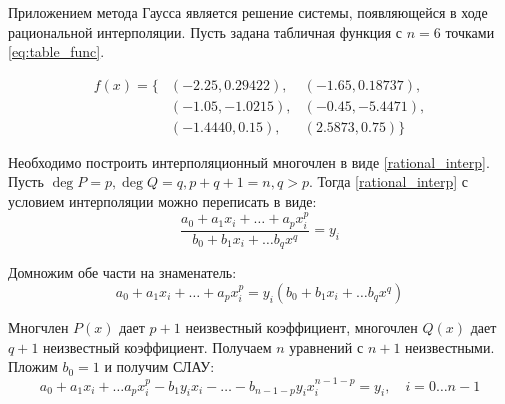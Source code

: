 \documentclass[a4paper, fontsize=14pt]{article}
\begin{document}
Приложением метода Гаусса является решение системы, появляющейся в ходе рациональной интерполяции. Пусть задана табличная функция с $n = 6$ точками \eqref{eq:table_func}.

\begin{equation}
    \label{eq:table_func}
    \begin{aligned}
        f(x) = \{&(-2.25,0.29422), &(-1.65, 0.18737), \\
                &(-1.05, -1.0215), &(-0.45,-5.4471), \\
                &(-1.4440,0.15), &(2.5873, 0.75)\}
        \end{aligned}
\end{equation}

Необходимо построить интерполяционный многочлен в виде \eqref{rational_interp}.
Пусть $\operatorname{deg} P = p, \operatorname{deg} Q = q, p + q + 1= n, q > p$. Тогда \eqref{rational_interp} с условием интерполяции можно переписать в виде:
\begin{equation*}
    \frac{a_0 + a_1 x_i + \dots + a_p x_i^p}{b_0 + b_1 x_i + \dots b_q x^q} = y_i
\end{equation*}

Домножим обе части на знаменатель:
\begin{equation*}
    a_0 + a_1 x_i + \dots + a_p x_i^p = y_i (b_0 + b_1 x_i + \dots b_q x^q)
\end{equation*}

Многчлен $P(x)$ дает $p+1$ неизвестный коэффициент, многочлен $Q(x)$ дает $q + 1$ неизвестный коэффициент. Получаем $n$ уравнений с  $n+1$ неизвестными.
Пложим $b_0 = 1$ и получим СЛАУ:
\begin{equation*}
    a_0 + a_1 x_i + \dots a_{p} x_i^p - b_1 y_i x_i - \dots - b_{n-   1-p} y_i x_i^{n-1-p} = y_i, \quad i = 0 \dots n - 1
\end{equation*}
\end{document}
